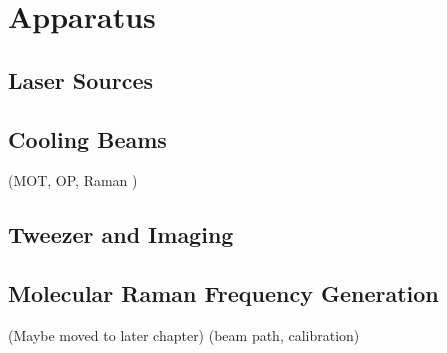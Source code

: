 
\chapter{Apparatus}
\label{ch:apparatus}

\section{Laser Sources}

\section{Cooling Beams}

(MOT, OP, Raman )

\section{Tweezer and Imaging}

\section{Molecular Raman Frequency Generation}
(Maybe moved to later chapter)
(beam path, calibration)
